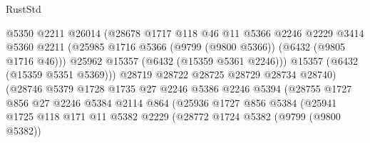 \begin{lexlean}{RustStd}
\begin{coremodule}
                                  @5350
                                  @2211
                                  @26014
                                  (@28678
                                    @1717
                                    @118
                                    @46
                                    @11
                                    @5366
                                    @2246
                                    @2229
                                    @3414
                                    @5360
                                    @2211
                                    (@25985
                                      @1716
                                      @5366
                                      (@9799 (@9800 @5366))
                                      (@6432 (@9805 @1716 @46)))
                                    @25962
                                    @15357
                                    (@6432 (@15359 @5361 @2246)))
                                  @15357
                                  (@6432 (@15359 @5351 @5369)))
                                @28719
                                @28722
                                @28725
                                @28729
                                @28734
                                @28740)
                              (@28746
                                @5379
                                @1728
                                @1735
                                @27
                                @2246
                                @5386
                                @2246
                                @5394
                                (@28755
                                  @1727
                                  @856
                                  @27
                                  @2246
                                  @5384
                                  @2114
                                  @864
                                  (@25936
                                    @1727
                                    @856
                                    @5384
                                    (@25941
                                      @1725
                                      @118
                                      @171
                                      @11
                                      @5382
                                      @2229
                                      (@28772
                                        @1724
                                        @5382
                                        (@9799 (@9800 @5382))

\end{coremodule}
\end{lexlean}
